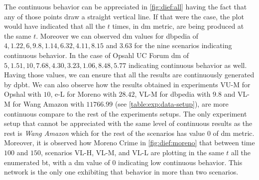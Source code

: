 The continuous behavior can be appreciated in \autoref{fig:dief:all} having the fact that any of those points draw a straight vertical line. 
If that were the case, the plot would have indicated that all the $t$ times, in \acrshort{dm} metric, are being produced at the same $t$.
Moreover we can observed \acrshort{dm} values for dbpedia of $4, 1.22, 6, 9.8, 1.14, 6.32, 4.11, 8.15$ and $3.63$ for the nine scenarios indicating continuous behavior. 
In the case of Opsahl UC Forum \acrshort{dm} of $5, 1.51, 10, 7.68, 4.30, 3.23, 1.06, 8.48, 5.77$ indicating continuous behavior as well.
Having those values, we can ensure that all the results are continuously generated by \acrshort{dpbt}.
We can also observe how the results obtained in experiments VU-M for Opshal with $10$, e-L for Moreno with $28.42$, VL-M for dbpedia with $9.8$ and VL-M for Wang Amazon with $11766.99$ (see \autoref{table:exp:data-setup}), are more continuous compare to the rest of the experiments setups. 
The only experiment setup that cannot be appreciated with the same level of continuous results as the rest is \emph{Wang Amazon} which for the rest of the scenarios has value $0$ of \acrshort{dm} metric. 
Moreover, it is observed how Moreno Crime in \autoref{fig:dief:moreno} that between time $100$ and $150$, scenarios VL-H, VL-M, and VL-L are plotting in the same $t$ all the enumerated \acrshort{bt}, with a \acrshort{dm} value of $0$ indicating low continuous behavior. 
This network is the only one exhibiting that behavior in more than two scenarios.

